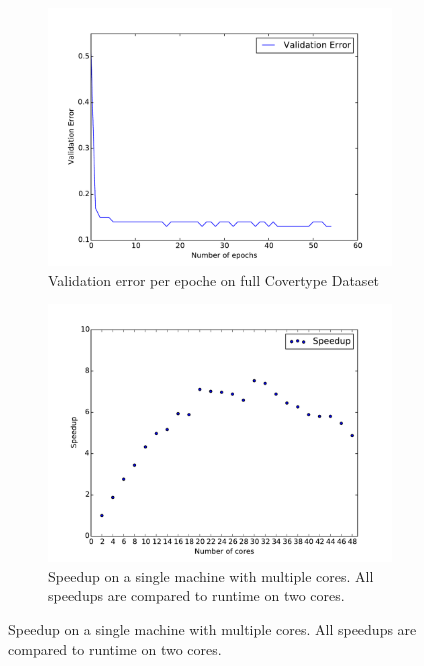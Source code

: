 \documentclass{article} %
\begin{document}
\begin{figure}[!ht]
	\begin{subfigure}[b]{0.5\textwidth}
		\centering
		\includegraphics[width=\textwidth]{imgs/covertype_validation.pdf}
		\caption{Validation error per epoche on full Covertype Dataset}
		\label{fig:covertype_validation}
	\end{subfigure}
	\begin{subfigure}[b]{0.5\textwidth}
		\centering
		\includegraphics[width=\textwidth]{imgs/speedup_58.pdf}
		\caption{Speedup on a single machine with multiple cores. All speedups are compared to runtime on two cores.}
		\label{fig:speedup_58}
	\end{subfigure}
\end{figure}
\end{document}
